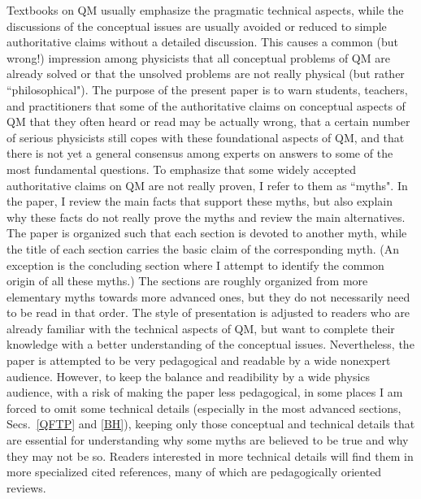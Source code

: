 \documentclass[12pt]{article}
\begin{document}
Textbooks on QM usually emphasize the pragmatic technical aspects, 
while the discussions of the conceptual issues are usually 
avoided or reduced to simple authoritative claims without a detailed 
discussion. This causes a common (but wrong!) impression among physicists 
that all conceptual problems of QM are already solved 
or that the unsolved problems are not really physical (but rather
``philosophical"). The purpose of the present paper is to 
warn students, teachers, and practitioners that some of the 
authoritative claims on conceptual aspects of QM that they often heard 
or read may be actually wrong, that a certain number of serious 
physicists still copes with these foundational aspects of QM, 
and that there is not yet a general consensus among experts on 
answers to some of the most fundamental questions.
To emphasize that some widely accepted authoritative claims on QM
are not really proven, I refer to them as ``myths".
In the paper, I review the main facts that support
these myths, but also explain why these facts do not really prove the myths
and review the main alternatives.
The paper is organized such that each section is devoted 
to another myth, while the title of each section carries 
the basic claim of the corresponding myth. (An exception 
is the concluding section where I attempt to identify 
the common origin of all these myths.)
The sections are 
roughly organized from more elementary myths  
towards more advanced ones,
but they do not necessarily need to be read in that order. 
The style of presentation is adjusted to readers who are 
already familiar with the technical aspects of QM, but 
want to complete their knowledge with a better understanding 
of the conceptual issues. Nevertheless,
the paper is attempted to be very pedagogical and readable 
by a wide nonexpert audience. However,
to keep the balance and readibility by a wide physics audience,
with a risk of making the paper less pedagogical,
in some places I am forced to omit some technical details
(especially in the most advanced sections, Secs.~\ref{QFTP} and \ref{BH}),
keeping only those conceptual and technical details that are essential
for understanding why some myths are believed to be true and why
they may not be so. Readers interested in more technical details
will find them in more specialized cited references, many of which
are pedagogically oriented reviews.
\end{document}
